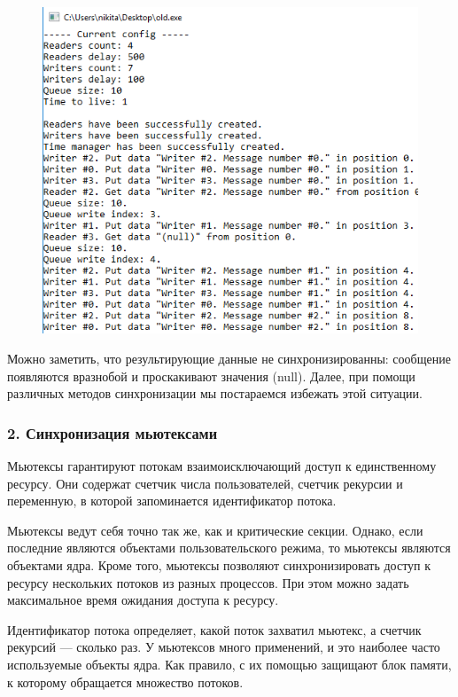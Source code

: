 \documentclass[14pt,a4paper,report]{report}
\begin{document}
\begin{figure}[h!]
	\centering
	\includegraphics[scale = 0.95]{images/p1_1.png}
	
	\caption{}
	\label{image:2}
\end{figure}

Можно заметить, что результирующие данные не синхронизированны: сообщение появляются вразнобой и проскакивают значения (null). Далее, при помощи различных методов синхронизации мы постараемся избежать этой ситуации.  

\subsubsection{2. Синхронизация мьютексами}

Мьютексы гарантируют потокам взаимоисключающий доступ к единственному ресурсу. Они содержат счетчик числа пользователей, счетчик рекурсии и переменную, в которой запоминается идентификатор потока.

Мьютексы ведут себя точно так же, как и критические секции. Однако, если последние являются объектами пользовательского режима, то мьютексы являются объектами ядра. Кроме того, мьютексы позволяют синхронизировать доступ к ресурсу нескольких потоков из разных процессов. При этом можно задать максимальное время ожидания доступа к ресурсу.

Идентификатор потока определяет, какой поток захватил мьютекс, а счетчик рекурсий — сколько раз. У мьютексов много применений, и это наиболее часто используемые объекты ядра. Как правило, с их помощью защищают блок памяти, к которому обращается множество потоков. 
\end{document}
